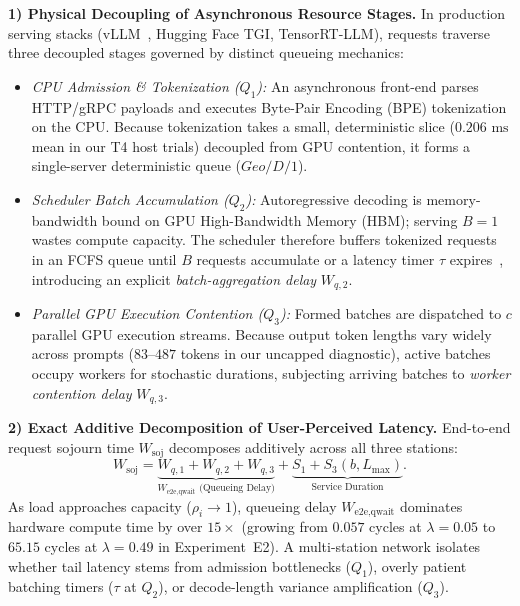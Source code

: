 \documentclass[conference]{IEEEtran}
\begin{document}
\textbf{1) Physical Decoupling of Asynchronous Resource Stages.}
In production serving stacks (vLLM~\cite{kwon2023vllm}, Hugging Face TGI, TensorRT-LLM), requests traverse three decoupled stages governed by distinct queueing mechanics:
\begin{itemize}\setlength{\itemsep}{0pt}\setlength{\topsep}{1pt}
  \item \emph{CPU Admission \& Tokenization ($Q_1$):} An asynchronous front-end parses HTTP/gRPC payloads and executes Byte-Pair Encoding (BPE) tokenization on the CPU. Because tokenization takes a small, deterministic slice ($0.206\text{ ms}$ mean in our T4 host trials) decoupled from GPU contention, it forms a single-server deterministic queue ($Geo/D/1$).
  \item \emph{Scheduler Batch Accumulation ($Q_2$):} Autoregressive decoding is memory-bandwidth bound on GPU High-Bandwidth Memory (HBM); serving $B{=}1$ wastes compute capacity. The scheduler therefore buffers tokenized requests in an FCFS queue until $B$ requests accumulate or a latency timer $\tau$ expires~\cite{yu2022orca}, introducing an explicit \emph{batch-aggregation delay} $W_{q,2}$.
  \item \emph{Parallel GPU Execution Contention ($Q_3$):} Formed batches are dispatched to $c$ parallel GPU execution streams. Because output token lengths vary widely across prompts ($83\text{--}487$ tokens in our uncapped diagnostic), active batches occupy workers for stochastic durations, subjecting arriving batches to \emph{worker contention delay} $W_{q,3}$.
\end{itemize}

\textbf{2) Exact Additive Decomposition of User-Perceived Latency.}
End-to-end request sojourn time $W_{\text{soj}}$ decomposes additively across all three stations:
\begin{equation}
W_{\text{soj}} = \underbrace{W_{q,1} + W_{q,2} + W_{q,3}}_{W_{\text{e2e,qwait}}\text{ (Queueing Delay)}} + \underbrace{S_1 + S_3(b, L_{\max})}_{\text{Service Duration}}.
\label{eq:sojourn_decomp}
\end{equation}
As load approaches capacity ($\rho_i \to 1$), queueing delay $W_{\text{e2e,qwait}}$ dominates hardware compute time by over $15\times$ (growing from $0.057$ cycles at $\lambda{=}0.05$ to $65.15$ cycles at $\lambda{=}0.49$ in Experiment~E2). A multi-station network isolates whether tail latency stems from admission bottlenecks ($Q_1$), overly patient batching timers ($\tau$ at $Q_2$), or decode-length variance amplification ($Q_3$).
\end{document}

